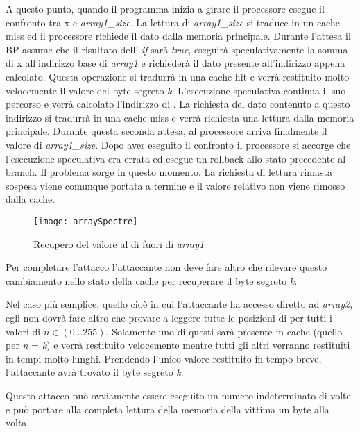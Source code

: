 			A questo punto, quando il programma inizia a girare il processore esegue il confronto tra x e \emph{array1\_size}. La lettura di \emph{array1\_size} si traduce in un cache miss ed il processore richiede il dato dalla memoria principale. Durante l'attesa il \ac{BP} assume che il risultato dell' \emph{if} sarà \emph{true}, eseguirà speculativamente la somma di x all'indirizzo base di \emph{array1} e richiederà il dato presente all'indirizzo appena calcolato. Questa operazione si tradurrà in una cache hit e verrà restituito molto velocemente il valore del byte segreto \emph{k}. L'esecuzione speculativa continua il suo percorso e verrà calcolato l'indirizzo di . La richiesta del dato contenuto a questo indirizzo si tradurrà in una cache miss e verrà richiesta una lettura dalla memoria principale. Durante questa seconda attesa, al processore arriva finalmente il valore di \emph{array1\_size}. Dopo aver eseguito il confronto il processore si accorge che l'esecuzione speculativa era errata ed esegue un rollback allo stato precedente al branch. Il problema sorge in questo momento. La richiesta di lettura rimasta sospesa viene comunque portata a termine e il valore relativo non viene rimosso dalla cache.
			
			\begin{figure}
				\begin{center}
					\texttt{[image: arraySpectre]}
					\caption{Recupero del valore al di fuori di \emph{array1}}
					\label{fig:array}
				\end{center}
			\end{figure}
			
			Per completare l'attacco l'attaccante non deve fare altro che rilevare questo cambiamento nello stato della cache per recuperare il byte segreto \emph{k}.
			
			Nel caso più semplice, quello cioè in cui l'attaccante ha accesso diretto ad \emph{array2}, egli non dovrà fare altro che provare  a leggere tutte le posizioni di  per tutti i valori di $n \in (0\dots255)$. Solamente uno di questi sarà presente in cache (quello per \emph{n} = \emph{k}) e verrà restituito velocemente mentre tutti gli altri verranno restituiti in tempi molto lunghi. Prendendo l'unico valore restituito in tempo breve, l'attaccante avrà trovato il byte segreto \emph{k}.
			
			Questo attacco può ovviamente essere eseguito un numero indeterminato di volte e può portare alla completa lettura della memoria della vittima un byte alla volta.
			
